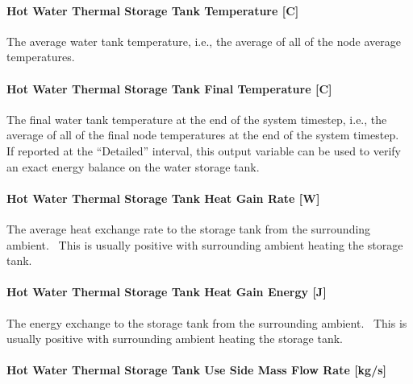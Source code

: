 \paragraph{Hot Water Thermal Storage Tank Temperature
{[}C{]}}\label{hot-water-thermal-storage-tank-temperature-thermalstoragehotwaterstratified}

The average water tank temperature, i.e., the average of all of the node average
temperatures.

\paragraph{Hot Water Thermal Storage Tank Final Temperature
{[}C{]}}\label{hot-water-thermal-storage-tank-final-temperature-thermalstoragehotwaterstratified}

The final water tank temperature at the end of the system timestep, i.e., the
average of all of the final node temperatures at the end of the system
timestep.~ If reported at the ``Detailed'' interval, this output variable can be
used to verify an exact energy balance on the water storage tank.

\paragraph{Hot Water Thermal Storage Tank Heat Gain Rate
{[}W{]}}\label{hot-water-thermal-storage-tank-heat-gain-rate-thermalstoragehotwaterstratified}

The average heat exchange rate to the storage tank from the surrounding
ambient.~ This is usually positive with surrounding ambient heating the storage
tank.

\paragraph{Hot Water Thermal Storage Tank Heat Gain Energy
{[}J{]}}\label{hot-water-thermal-storage-tank-heat-gain-energy-thermalstoragehotwaterstratified}

The energy exchange to the storage tank from the surrounding ambient.~ This is
usually positive with surrounding ambient heating the storage tank.

\paragraph{Hot Water Thermal Storage Tank Use Side Mass Flow Rate
{[}kg/s{]}}\label{hot-water-thermal-storage-use-side-mass-flow-rate-thermalstoragehotwaterstratified}


